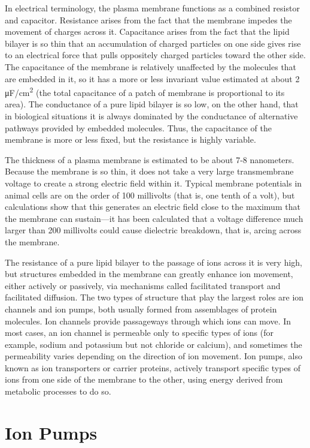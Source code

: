 In electrical terminology, the plasma membrane functions as a combined resistor and capacitor. Resistance arises from the fact that the membrane impedes the movement of charges across it. Capacitance arises from the fact that the lipid bilayer is so thin that an accumulation of charged particles on one side gives rise to an electrical force that pulls oppositely charged particles toward the other side. The capacitance of the membrane is relatively unaffected by the molecules that are embedded in it, so it has a more or less invariant value estimated at about 2 μF/cm\textsuperscript{2} (the total capacitance of a patch of membrane is proportional to its area). The conductance of a pure lipid bilayer is so low, on the other hand, that in biological situations it is always dominated by the conductance of alternative pathways provided by embedded molecules. Thus, the capacitance of the membrane is more or less fixed, but the resistance is highly variable.

The thickness of a plasma membrane is estimated to be about 7-8 nanometers. Because the membrane is so thin, it does not take a very large transmembrane voltage to create a strong electric field within it. Typical membrane potentials in animal cells are on the order of 100 millivolts (that is, one tenth of a volt), but calculations show that this generates an electric field close to the maximum that the membrane can sustain---it has been calculated that a voltage difference much larger than 200 millivolts could cause dielectric breakdown, that is, arcing across the membrane.

The resistance of a pure lipid bilayer to the passage of ions across it is very high, but structures embedded in the membrane can greatly enhance ion movement, either actively or passively, via mechanisms called facilitated transport and facilitated diffusion. The two types of structure that play the largest roles are ion channels and ion pumps, both usually formed from assemblages of protein molecules. Ion channels provide passageways through which ions can move. In most cases, an ion channel is permeable only to specific types of ions (for example, sodium and potassium but not chloride or calcium), and sometimes the permeability varies depending on the direction of ion movement. Ion pumps, also known as ion transporters or carrier proteins, actively transport specific types of ions from one side of the membrane to the other, using energy derived from metabolic processes to do so.

\hypertarget{ion-pumps}{%
\section{Ion Pumps}\label{ion-pumps}}

